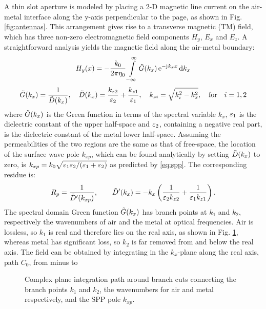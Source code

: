 \documentclass[11pt]{article}
\begin{document}
A thin slot aperture is modeled by placing a 2-D magnetic line current on the air-metal interface along the y-axis perpendicular to the page, as shown in Fig. \ref{fig:antennas}. This arrangement gives rise to a transverse magnetic (TM) field, which has three non-zero electromagnetic field components $H_y$, $E_x$ and $E_z$. A straightforward analysis yields the magnetic field along the air-metal boundary:
%
\begin{equation}
  H_y(x) =  - \frac{k_0}{2 \pi \eta_0} \int\limits_{-\infty}^\infty  \tilde{G}(k_x) \, \mathrm{e}^{ - \mathrm{j}\mkern1mu k_x x} \mathop{}\!\mathrm{d} {k_x}
  \label{eq:Sommerfeld}
\end{equation}
%
\begin{equation}
  \tilde{G}(k_x) = \frac{1}{\tilde{D}(k_x)}, \quad
  \tilde{D}(k_x) = \frac{k_{z2}}{\varepsilon_2} + \frac{k_{z1}}{\varepsilon_1}, \quad
  k_{zi} = \sqrt{k_i^2 - k_x^2}, \quad \text{for} \quad i=1,2
  \label{eq:somm_details}
\end{equation}
%
where $\tilde{G}(k_x)$ is the Green function in terms of the spectral variable $k_x$, $\varepsilon_1$ is the dielectric constant of the upper half-space and $\varepsilon_2$, containing a negative real part, is the dielectric constant of the metal lower half-space. Assuming the permeabilities of the two regions are the same as that of free-space, the location of the surface wave pole $k_{xp}$, which can be found analytically by setting $\tilde{D}(k_x)$ to zero, is
$k_{xp} = k_0 \sqrt{ \varepsilon_1 \varepsilon_2 /{(\varepsilon_1 + \varepsilon_2)}}$ as predicted by \eqref{eq:spp}. The corresponding residue is:
%
\begin{equation}
  R_p = \frac{1}{\tilde{D}'(k_{xp})}, \qquad
  \tilde{D}'(k_x) =  -{k_x}\left( \frac{1}{\varepsilon_2 k_{z2}} + \frac{1}{\varepsilon_1 k_{z1}} \right).
  \label{eq:residue}
\end{equation}
%
The spectral domain Green function $\tilde{G}(k_x)$ has branch points at $k_1$ and  $k_2$, respectively the wavenumbers of air and the metal at optical frequencies. Air is lossless, so $k_1$ is real and therefore lies on the real axis, as shown in Fig. \ref{fig:contour}, whereas metal has significant loss, so $k_2$ is far removed from and below the real axis. The field can be obtained by integrating in the $k_x$-plane along the real axis, path $C_0$, from minus to
%
\begin{figure}[h!]
  \centering
  \def\svgwidth{.5\linewidth}
  
  \caption{Complex plane integration path around branch cuts connecting the branch points $k_1$ and $k_2$, the wavenumbers for air and metal respectively, and the SPP pole $k_{xp}$.}
  \label{fig:contour}
\end{figure}
\end{document}
